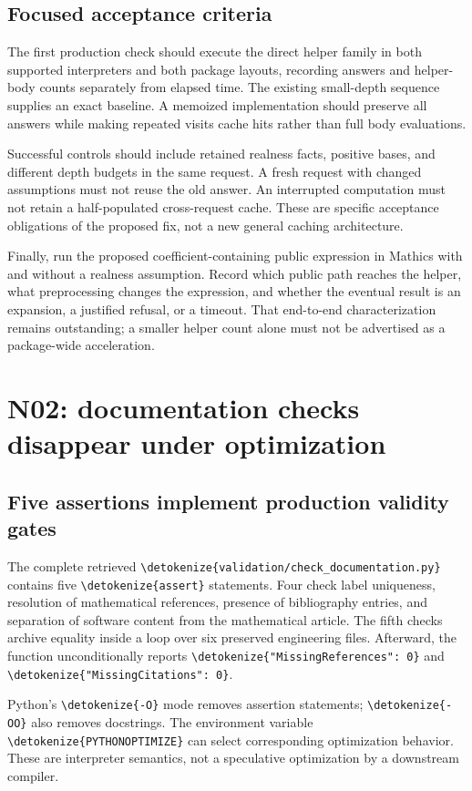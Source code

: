 \documentclass[11pt,letterpaper]{article}
\newcommand{\code}[1]{\expandafter\nolinkurl\expandafter{\detokenize{#1}}}
\begin{document}
\subsection{Focused acceptance criteria}

The first production check should execute the direct helper family in both supported interpreters and both package layouts, recording answers and helper-body counts separately from elapsed time. The existing small-depth sequence supplies an exact baseline. A memoized implementation should preserve all answers while making repeated visits cache hits rather than full body evaluations.

Successful controls should include retained realness facts, positive bases, and different depth budgets in the same request. A fresh request with changed assumptions must not reuse the old answer. An interrupted computation must not retain a half-populated cross-request cache. These are specific acceptance obligations of the proposed fix, not a new general caching architecture.

Finally, run the proposed coefficient-containing public expression in Mathics with and without a realness assumption. Record which public path reaches the helper, what preprocessing changes the expression, and whether the eventual result is an expansion, a justified refusal, or a timeout. That end-to-end characterization remains outstanding; a smaller helper count alone must not be advertised as a package-wide acceleration.

\section{N02: documentation checks disappear under optimization}
\subsection{Five assertions implement production validity gates}

The complete retrieved \code{validation/check_documentation.py} contains five \code{assert} statements. Four check label uniqueness, resolution of mathematical references, presence of bibliography entries, and separation of software content from the mathematical article. The fifth checks archive equality inside a loop over six preserved engineering files. Afterward, the function unconditionally reports \code{"MissingReferences": 0} and \code{"MissingCitations": 0}.\cite{doccheck}

Python's \code{-O} mode removes assertion statements; \code{-OO} also removes docstrings. The environment variable \code{PYTHONOPTIMIZE} can select corresponding optimization behavior. These are interpreter semantics, not a speculative optimization by a downstream compiler.\cite{pythonopt,pythonassert}
\end{document}
